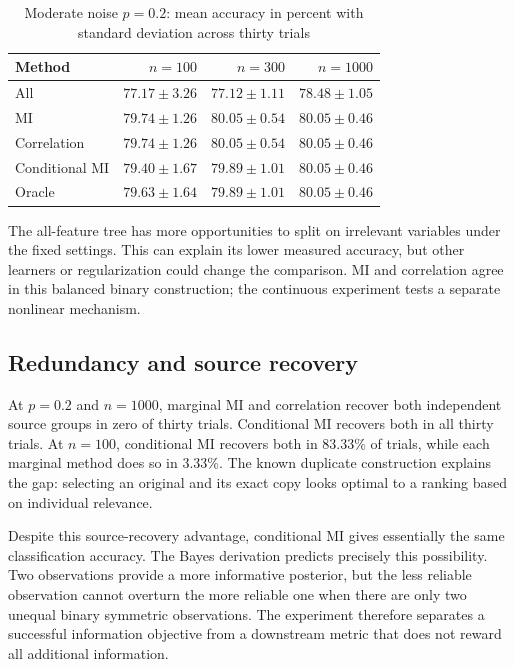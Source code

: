 \documentclass[journal,11pt]{IEEEtran}
\begin{document}
\begin{table}[!t]
\caption{Moderate noise $p=0.2$: mean accuracy in percent with standard deviation across thirty trials}
\label{tab:acc}\centering
\begin{tabular}{lrrr}\toprule
Method & $n=100$ & $n=300$ & $n=1000$\\\midrule
All & $77.17\pm3.26$ & $77.12\pm1.11$ & $78.48\pm1.05$\\
MI & $79.74\pm1.26$ & $80.05\pm0.54$ & $80.05\pm0.46$\\
Correlation & $79.74\pm1.26$ & $80.05\pm0.54$ & $80.05\pm0.46$\\
Conditional MI & $79.40\pm1.67$ & $79.89\pm1.01$ & $80.05\pm0.46$\\
Oracle & $79.63\pm1.64$ & $79.89\pm1.01$ & $80.05\pm0.46$\\\bottomrule
\end{tabular}
\end{table}

The all-feature tree has more opportunities to split on irrelevant variables under the fixed settings. This can explain its lower measured accuracy, but other learners or regularization could change the comparison. MI and correlation agree in this balanced binary construction; the continuous experiment tests a separate nonlinear mechanism.

\subsection{Redundancy and source recovery}
At $p=0.2$ and $n=1000$, marginal MI and correlation recover both independent source groups in zero of thirty trials. Conditional MI recovers both in all thirty trials. At $n=100$, conditional MI recovers both in 83.33\% of trials, while each marginal method does so in 3.33\%. The known duplicate construction explains the gap: selecting an original and its exact copy looks optimal to a ranking based on individual relevance.

Despite this source-recovery advantage, conditional MI gives essentially the same classification accuracy. The Bayes derivation predicts precisely this possibility. Two observations provide a more informative posterior, but the less reliable observation cannot overturn the more reliable one when there are only two unequal binary symmetric observations. The experiment therefore separates a successful information objective from a downstream metric that does not reward all additional information.
\end{document}
